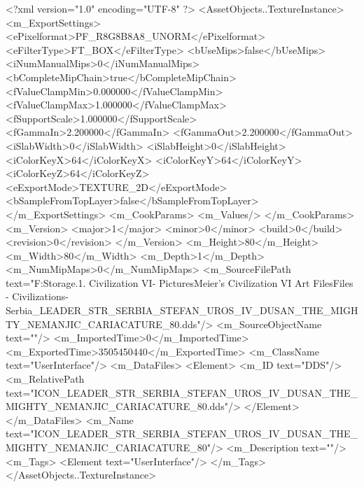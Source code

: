<?xml version="1.0" encoding="UTF-8" ?>
<AssetObjects..TextureInstance>
	<m_ExportSettings>
		<ePixelformat>PF_R8G8B8A8_UNORM</ePixelformat>
		<eFilterType>FT_BOX</eFilterType>
		<bUseMips>false</bUseMips>
		<iNumManualMips>0</iNumManualMips>
		<bCompleteMipChain>true</bCompleteMipChain>
		<fValueClampMin>0.000000</fValueClampMin>
		<fValueClampMax>1.000000</fValueClampMax>
		<fSupportScale>1.000000</fSupportScale>
		<fGammaIn>2.200000</fGammaIn>
		<fGammaOut>2.200000</fGammaOut>
		<iSlabWidth>0</iSlabWidth>
		<iSlabHeight>0</iSlabHeight>
		<iColorKeyX>64</iColorKeyX>
		<iColorKeyY>64</iColorKeyY>
		<iColorKeyZ>64</iColorKeyZ>
		<eExportMode>TEXTURE_2D</eExportMode>
		<bSampleFromTopLayer>false</bSampleFromTopLayer>
	</m_ExportSettings>
	<m_CookParams>
		<m_Values/>
	</m_CookParams>
	<m_Version>
		<major>1</major>
		<minor>0</minor>
		<build>0</build>
		<revision>0</revision>
	</m_Version>
	<m_Height>80</m_Height>
	<m_Width>80</m_Width>
	<m_Depth>1</m_Depth>
	<m_NumMipMaps>0</m_NumMipMaps>
	<m_SourceFilePath text="F:\Mod Storage\2.1. Civilization VI\Mods\Archive - Pictures\Sid Meier's Civilization VI Art Files\Art Files - Civilizations\Civilization - Serbia\ICON_LEADER_STR_SERBIA_STEFAN_UROS_IV_DUSAN_THE_MIGHTY_NEMANJIC_CARIACATURE_80.dds"/>
	<m_SourceObjectName text=""/>
	<m_ImportedTime>0</m_ImportedTime>
	<m_ExportedTime>3505450440</m_ExportedTime>
	<m_ClassName text="UserInterface"/>
	<m_DataFiles>
		<Element>
			<m_ID text="DDS"/>
			<m_RelativePath text="ICON_LEADER_STR_SERBIA_STEFAN_UROS_IV_DUSAN_THE_MIGHTY_NEMANJIC_CARIACATURE_80.dds"/>
		</Element>
	</m_DataFiles>
	<m_Name text="ICON_LEADER_STR_SERBIA_STEFAN_UROS_IV_DUSAN_THE_MIGHTY_NEMANJIC_CARIACATURE_80"/>
	<m_Description text=""/>
	<m_Tags>
		<Element text="UserInterface"/>
	</m_Tags>
</AssetObjects..TextureInstance>

